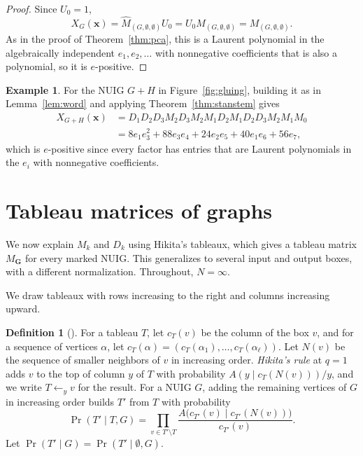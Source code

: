\documentclass[12pt]{article}
\theoremstyle{plain}
\theoremstyle{definition}
\newtheorem{definition}[theorem]{Definition}
\newtheorem{example}[theorem]{Example}
\theoremstyle{remark}
\newcommand{\bG}{\mathbf{G}}
\begin{document}
\begin{proof}
Since $U_0=1$,
\[
X_G(\bm x)=\hat M_{(G,\emptyset,\emptyset)}U_0=U_0M_{(G,\emptyset,\emptyset)}=M_{(G,\emptyset,\emptyset)}.
\]
As in the proof of Theorem~\ref{thm:pca}, this is a Laurent polynomial in the algebraically independent $e_1,e_2,\dots$ with nonnegative coefficients that is also a polynomial, so it is $e$-positive.
\end{proof}

\begin{example}\label{ex:stanstem}
For the NUIG $G+H$ in Figure~\ref{fig:gluing}, building it as in
Lemma~\ref{lem:word} and applying Theorem~\ref{thm:stanstem} gives
\begin{align*}
X_{G+H}(\bm x)&=D_1D_2D_3M_2D_3M_2M_1D_2M_1D_2D_3M_2M_1M_0\\
&=8e_1e_3^2+88e_3e_4+24e_2e_5+40e_1e_6+56e_7,
\end{align*}
which is $e$-positive since every factor has entries that are Laurent
polynomials in the $e_i$ with nonnegative coefficients.
\end{example}


\section{Tableau matrices of graphs}\label{section:extra}

We now explain $M_k$ and $D_k$ using Hikita's tableaux, which gives a
tableau matrix $M_\bG$ for every marked NUIG. This generalizes
\cite[Section 4]{singlegluing} to several input and output boxes, with a
different normalization. Throughout, $N=\infty$.

We draw tableaux with rows increasing to the right and columns
increasing upward.

\begin{definition}[{\cite[Definitions 1.2 and 1.5]{stanstemproof}}]\label{def:hikita-rule}
For a tableau $T$, let $c_T(v)$ be the column of the box $v$, and for a
sequence of vertices $\alpha$, let
$c_T(\alpha)=(c_T(\alpha_1),\dots,c_T(\alpha_\ell))$. Let
$N(v)$ be the sequence of smaller neighbors of $v$ in increasing order.
\emph{Hikita's rule} at $q=1$ adds $v$ to the top of column $y$ of $T$
with probability $A(y\mid c_T(N(v)))/y$, and we write
$T\leftarrow_y v$ for the result. For a NUIG $G$, adding the remaining
vertices of $G$ in increasing order builds $T'$ from $T$ with probability
\[
\Pr(T'\mid T,G)=\prod_{v\in T'\setminus T}
 \frac{A\bigl(c_{T'}(v)\mid c_{T'}(N(v))\bigr)}{c_{T'}(v)}.
\]
Let
$\Pr(T'\mid G)=\Pr(T'\mid\emptyset,G)$.
\end{definition}
\end{document}

